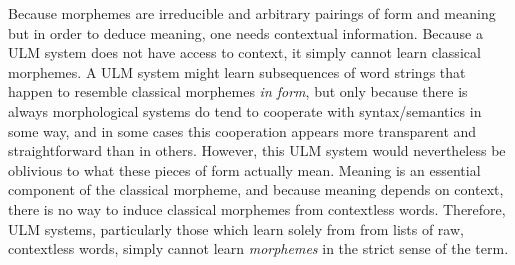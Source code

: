 Because morphemes are irreducible and arbitrary pairings of form and meaning
but in order to deduce meaning, one needs contextual information. Because
a \ac{ULM} system does not have access to context, it simply cannot learn classical morphemes.
A \ac{ULM} system might learn subsequences of word strings that happen to resemble
 classical morphemes \emph{in form}, but only because there is always morphological systems do 
 tend to cooperate with syntax/semantics in some way, and in some cases this cooperation appears more transparent and straightforward than
 in others.  However, this \ac{ULM} system 
 would nevertheless be oblivious to what
 these pieces of form actually mean. Meaning is an essential component of the classical morpheme, and because
 meaning depends on context, there is no way to induce classical morphemes from contextless words.
Therefore, \ac{ULM} systems, particularly those which learn solely from 
from lists of raw, contextless words, simply cannot learn 
\emph{morphemes} in the strict sense of the term.

